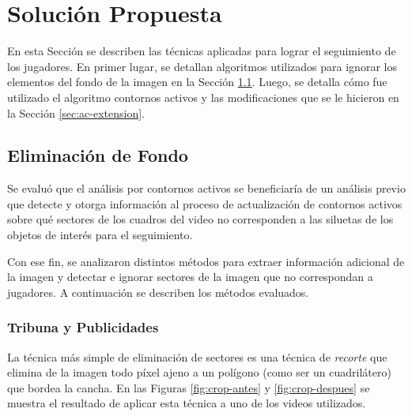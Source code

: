 \chapter{Solución Propuesta}
\label{chap-solution}

En esta Sección se describen las técnicas aplicadas para lograr el seguimiento
de los jugadores. En primer lugar, se detallan algoritmos utilizados para
ignorar los elementos del fondo de la imagen en la Sección
\ref{sec:background-elimination}. Luego, se detalla cómo fue utilizado el
algoritmo contornos activos y las modificaciones que se le hicieron en la
Sección \ref{sec:ac-extension}.

\section{Eliminación de Fondo}

\label{sec:background-elimination}
Se evaluó que el análisis por contornos activos se beneficiaría de un análisis
previo que detecte y otorga información al proceso de actualización de
contornos activos sobre qué sectores de los cuadros del video no corresponden a
las siluetas de los objetos de interés para el seguimiento.

Con ese fin, se analizaron distintos métodos para extraer información adicional
de la imagen y detectar e ignorar sectores de la imagen que no correspondan a
jugadores. A continuación se describen los métodos evaluados.

\subsection{Tribuna y Publicidades}
\label{subsec:crop-tribunas}

La técnica más simple de eliminación de sectores es una técnica de
\textit{recorte} que elimina de la imagen todo píxel ajeno a un polígono
(como ser un cuadrilátero) que bordea la cancha. En las Figuras
\ref{fig:crop-antes} y \ref{fig:crop-despues} se muestra el resultado de
aplicar esta técnica a uno de los videos utilizados.

